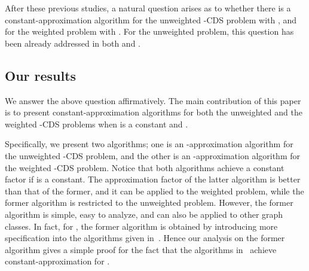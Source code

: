 \documentclass[11pt]{article}
\begin{document}
After these previous studies,
a natural question arises as to whether there
is a constant-approximation algorithm
for the unweighted -CDS problem with ,
and for the weighted problem with .
For the unweighted problem, this question has been already addressed in
both \cite{WangKAGLZW13} and \cite{Wang:2015}.


\subsection{Our results}
\label{sec.ourresults}
We answer the above question affirmatively.
The main contribution of this paper is to present
constant-approximation algorithms
for both the unweighted and the weighted -CDS problems
when  is a constant and .

Specifically, we present two algorithms;
one is an -approximation algorithm for the unweighted -CDS problem,
and the other is an -approximation algorithm for the
weighted -CDS problem.
Notice that both algorithms achieve a constant factor if  is a constant.
The approximation factor of the latter algorithm is better than that of
the former,
and it can be applied to the weighted problem, while the former algorithm is
restricted to the unweighted problem.
However, the former algorithm is simple, easy to analyze,
and can also be applied to other graph classes.
In fact,
 for ,
 the former algorithm is obtained by introducing more
 specification into the algorithms
 given in~\cite{Shang:2007jg,Wang:2015}.
 Hence our analysis on the former algorithm gives a simple proof for the
 fact that the algorithms in~\cite{Shang:2007jg,Wang:2015} achieve
 constant-approximation for .
\end{document}

